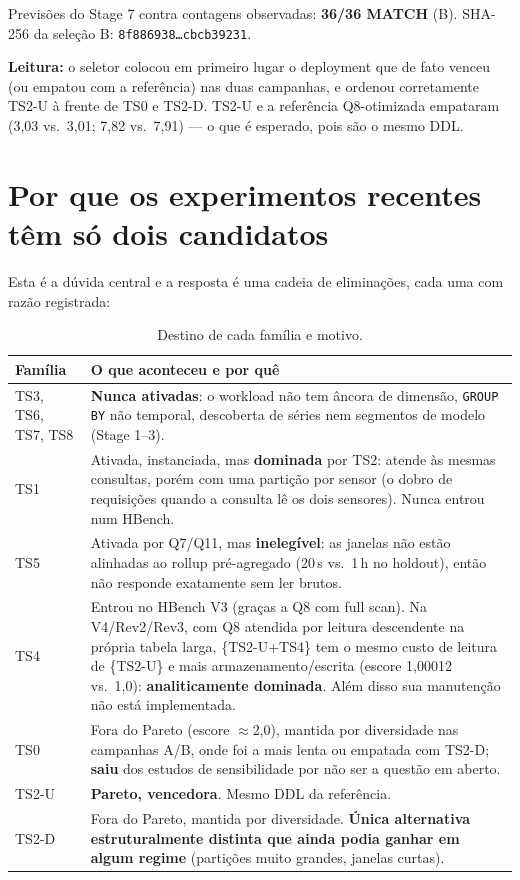 \documentclass[11pt,a4paper]{article}
\begin{document}
Previsões do Stage 7 contra contagens observadas: \textbf{36/36 MATCH} (B). SHA-256 da seleção B: \texttt{8f886938\ldots cbcb39231}.

\textbf{Leitura:} o seletor colocou em primeiro lugar o deployment que de fato venceu (ou empatou com a referência) nas duas campanhas, e ordenou corretamente TS2-U à frente de TS0 e TS2-D. TS2-U e a referência Q8-otimizada empataram (3,03 vs.\ 3,01; 7,82 vs.\ 7,91) --- o que é esperado, pois são o mesmo DDL.

\section{Por que os experimentos recentes têm só dois candidatos}
\label{sec:doiscand}

Esta é a dúvida central e a resposta é uma cadeia de eliminações, cada uma com razão registrada:

\begin{table}[H]\centering\small
\caption{Destino de cada família e motivo.}
\begin{tabularx}{\linewidth}{@{}lY@{}}\toprule
\textbf{Família} & \textbf{O que aconteceu e por quê}\\\midrule
TS3, TS6, TS7, TS8 & \textbf{Nunca ativadas}: o workload não tem âncora de dimensão, \texttt{GROUP BY} não temporal, descoberta de séries nem segmentos de modelo (Stage 1--3).\\
TS1 & Ativada, instanciada, mas \textbf{dominada} por TS2: atende às mesmas consultas, porém com uma partição por sensor (o dobro de requisições quando a consulta lê os dois sensores). Nunca entrou num HBench.\\
TS5 & Ativada por Q7/Q11, mas \textbf{inelegível}: as janelas não estão alinhadas ao rollup pré-agregado (20\,s vs.\ 1\,h no holdout), então não responde exatamente sem ler brutos.\\
TS4 & Entrou no HBench V3 (graças a Q8 com full scan). Na V4/Rev2/Rev3, com Q8 atendida por leitura descendente na própria tabela larga, \{TS2-U+TS4\} tem o mesmo custo de leitura de \{TS2-U\} e mais armazenamento/escrita (escore 1,00012 vs.\ 1,0): \textbf{analiticamente dominada}. Além disso sua manutenção não está implementada.\\
TS0 & Fora do Pareto (escore $\approx$2,0), mantida por diversidade nas campanhas A/B, onde foi a mais lenta ou empatada com TS2-D; \textbf{saiu} dos estudos de sensibilidade por não ser a questão em aberto.\\
TS2-U & \textbf{Pareto, vencedora}. Mesmo DDL da referência.\\
TS2-D & Fora do Pareto, mantida por diversidade. \textbf{Única alternativa estruturalmente distinta que ainda podia ganhar em algum regime} (partições muito grandes, janelas curtas).\\\bottomrule
\end{tabularx}\end{table}
\end{document}
